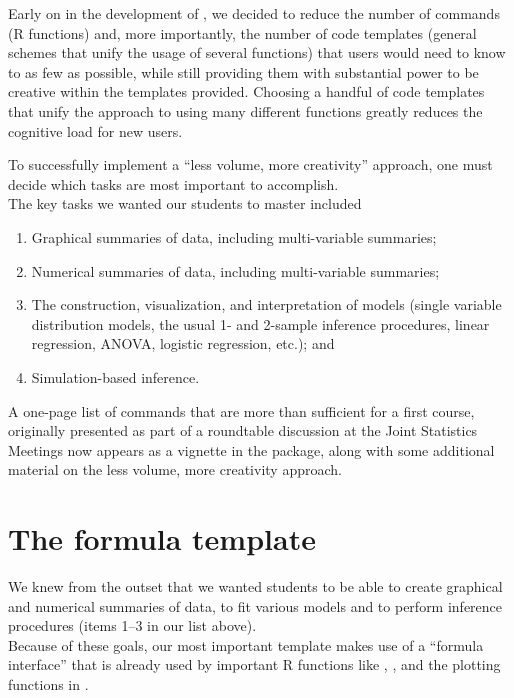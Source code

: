 Early on in the development of , we decided to reduce the
number of commands (R functions) and, more importantly, the number of
code templates (general schemes that unify the usage of several
functions) that users would need to know to as few as possible, while
still providing them with substantial power to be creative within the
templates provided. Choosing a handful of code templates that unify the
approach to using many different functions greatly reduces the cognitive
load for new users.

To successfully implement a ``less volume, more creativity'' approach,
one must decide which tasks are most important to accomplish.\\
The key tasks we wanted our students to master included

\begin{enumerate}
\def\labelenumi{\arabic{enumi}.}
\tightlist
\item
  Graphical summaries of data, including multi-variable summaries;
\item
  Numerical summaries of data, including multi-variable summaries;
\item
  The construction, visualization, and interpretation of models (single
  variable distribution models, the usual 1- and 2-sample inference
  procedures, linear regression, ANOVA, logistic regression, etc.); and
\item
  Simulation-based inference.
\end{enumerate}

A one-page list of commands that are more than sufficient for a first
course, originally presented as part of a roundtable discussion at the
Joint Statistics Meetings \citep{Pruim:MinimalR:2011} now appears as a
vignette in the package, along with some additional material on the less
volume, more creativity approach.

\section{The formula template}\label{the-formula-template}

We knew from the outset that we wanted students to be able to create
graphical and numerical summaries of data, to fit various models and to
perform inference procedures (items 1--3 in our list above).\\
Because of these goals, our most important template makes use of a
``formula interface'' that is already used by important R functions like
, , and the plotting functions in
\citep{lattice}.

